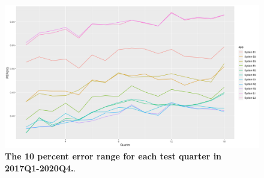 \begin{figure}[ht]
\begin{center}
\includegraphics[scale=0.4]{./images/per10_16windows}
\caption{{\bf The 10 percent error range for each test quarter in 2017Q1-2020Q4.}.\setlength{\baselineskip}{1.25em}}
\label{fig_errors_per10}
\end{center}
\end{figure}